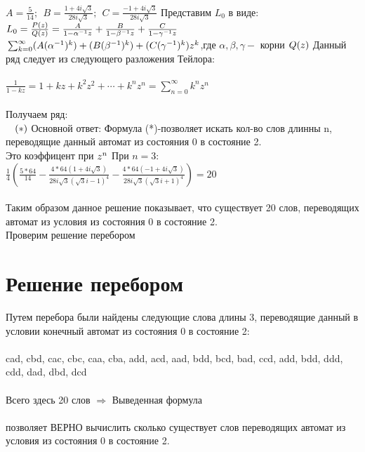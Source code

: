 \documentclass[a4paper,12pt]{article} %
\begin{document}
		$ A=\frac{5}{14};\:\:B=\frac{1+4i\sqrt{3}}{28i \sqrt{3}};\:\:C=\frac{-1+4i\sqrt{3}}{28i \sqrt{3}} $
		\newpage
		Представим $ L_0 $ в виде:\\
		$ L_0=\frac{P(z)}{Q(z)}=\frac{A}{1-\alpha^{-1}z}+\frac{B}{1-\beta^{-1}z}+\frac{C}{1-\gamma^{-1}z}\\ $
		$\\ \sum_{k=0}^{\infty}(A(\alpha^{-1})^k)+(B(\beta^{-1})^k)+(C(\gamma^{-1})^k)z^k $,где $ \alpha,\beta,\gamma-$ корни $ Q(z)\\ \\ $ Данный ряд следует из следующего разложения Тейлора:\\ \\
		$ \frac{1}{1-kz}=1+kz+k^2z^2+\cdots+k^nz^n=\sum_{n=0}^{\infty}k^nz^n $\\ \\
		Получаем ряд:\\
		$\:\:\:\:(*) \\ \\ \\$
		Основной ответ: Формула (*)-позволяет искать кол-во слов длинны n, переводящие данный автомат из состояния 0 в состояние 2.\\Это коэффицент при $ z^n\\ \\ $
		При $ n=3 $:\\
		$ \frac{1}{4}\left( \frac{5*64}{14}-\frac{4*64(1+4i\sqrt{3})}{28i \sqrt{3}(\sqrt{3}i-1)^4}-\frac{4*64(-1+4i\sqrt{3})}{28i \sqrt{3}(\sqrt{3}i+1)^4} \right)=20 $\\ \\
		Таким образом данное решение показывает, что существует 20 слов, переводящих автомат из условия из состояния 0 в состояние 2.\\ Проверим решение перебором 
		\newpage
		\section{Решение перебором}
		Путем перебора были найдены следующие слова длины 3, переводящие данный в условии конечный автомат из состояния 0 в состояние 2:\\ \\
		cad, cbd, cac, cbc, caa, cba, add, acd, aad, bdd, bcd, bad, ccd, add, bdd, ddd, cdd, dad, dbd, dcd\\ \\ Всего здесь 20 слов $ \Rightarrow $ Выведенная формула\\
		\\ позволяет ВЕРНО вычислить сколько существует слов переводящих автомат из условия из состояния 0 в состояние 2.
		\newpage
\end{document}

